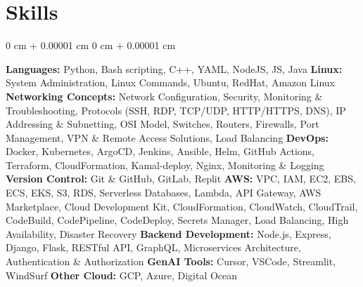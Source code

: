 \documentclass[10pt, letterpaper]{article}
\newenvironment{onecolentry}{
    \begin{adjustwidth}{
        0 cm + 0.00001 cm
    }{
        0 cm + 0.00001 cm
    }
}{
    \end{adjustwidth}
}
\begin{document}
\section{Skills}
\vspace{0.10 cm}
\begin{onecolentry}
    \textbf{Languages:} Python, Bash scripting, C++, YAML, NodeJS, JS, Java
    \vspace{0.1cm}
    \textbf{Linux:} System Administration, Linux Commands, Ubuntu, RedHat, Amazon Linux
    \vspace{0.1cm}
    \textbf{Networking Concepts:} Network Configuration, Security, Monitoring \& Troubleshooting, Protocols (SSH, RDP, TCP/UDP, HTTP/HTTPS, DNS), IP Addressing \& Subnetting, OSI Model, Switches, Routers, Firewalls, Port Management, VPN & Remote Access Solutions, Load Balancing
    \vspace{0.1cm}
    \textbf{DevOps:} Docker, Kubernetes, ArgoCD, Jenkins, Ansible, Helm, GitHub Actions, Terraform, CloudFormation, Kamal-deploy, Nginx, Monitoring \& Logging
    \vspace{0.1cm}
    \textbf{Version Control:} Git \& GitHub, GitLab, Replit
    \vspace{0.1cm}
    \textbf{AWS:} VPC, IAM, EC2, EBS, ECS, EKS, S3, RDS, Serverless Databases, Lambda, API Gateway, AWS Marketplace, Cloud Development Kit, CloudFormation, CloudWatch, CloudTrail, CodeBuild, CodePipeline, CodeDeploy, Secrets Manager, Load Balancing, High Availability, Disaster Recovery
    \vspace{0.1cm}
    \textbf{Backend Development:} Node.js, Express, Django, Flask, RESTful API, GraphQL, Microservices Architecture, Authentication \& Authorization
    \vspace{0.1cm}
    \textbf{GenAI Tools:} Cursor, VSCode, Streamlit, WindSurf
    \vspace{0.1cm}
    \textbf{Other Cloud:} GCP, Azure, Digital Ocean
\end{onecolentry}
\end{document}
